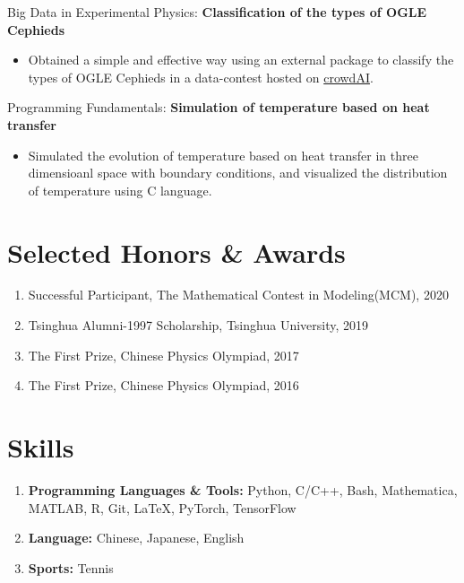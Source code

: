 \documentclass{resume}
\begin{document}
Big Data in Experimental Physics: \textbf{Classification of the types of OGLE Cephieds}
\begin{itemize}
    \item Obtained a simple and effective way using an external package to classify the types of OGLE Cephieds in a data-contest hosted on \href{https://data-contest.applysquare.com/challenges/pd2020}{crowdAI}.
\end{itemize}

Programming Fundamentals: \textbf{Simulation of temperature based on heat transfer}
\begin{itemize}
    \item Simulated the evolution of temperature based on heat transfer in three dimensioanl space with boundary conditions, and visualized the distribution of temperature using C language.
\end{itemize}


\section{Selected Honors \& Awards}
\begin{enumerate}
    \item Successful Participant, The Mathematical Contest in Modeling(MCM), 2020
    \item Tsinghua Alumni-1997 Scholarship, Tsinghua University, 2019
    \item The First Prize, Chinese Physics Olympiad, 2017
    \item The First Prize, Chinese Physics Olympiad, 2016
\end{enumerate}


\section{Skills}
\begin{enumerate}
  \item \textbf{Programming Languages \& Tools:} \small Python, C/C++, Bash, Mathematica, MATLAB, R, Git, \LaTeX, PyTorch, TensorFlow
  \item \textbf{Language:} \small Chinese, Japanese, English 
  \item \textbf{Sports:} \small Tennis
\end{enumerate}
\end{document}
